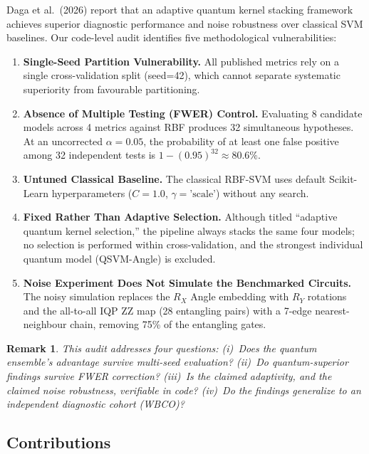\documentclass[journal,twocolumn]{IEEEtran}
\newtheorem{remark}{Remark}
\begin{document}
Daga et al.\ (2026) \cite{daga2026adaptive} report that an adaptive quantum kernel stacking framework achieves superior diagnostic performance and noise robustness over classical SVM baselines. Our code-level audit identifies five methodological vulnerabilities:

\begin{enumerate}
    \item \textbf{Single-Seed Partition Vulnerability.} All published metrics rely on a single cross-validation split (seed=42), which cannot separate systematic superiority from favourable partitioning.
    \item \textbf{Absence of Multiple Testing (FWER) Control.} Evaluating 8 candidate models across 4 metrics against RBF produces 32 simultaneous hypotheses. At an uncorrected $\alpha = 0.05$, the probability of at least one false positive among 32 independent tests is $1 - (0.95)^{32} \approx 80.6\%$.
    \item \textbf{Untuned Classical Baseline.} The classical RBF-SVM uses default Scikit-Learn hyperparameters ($C=1.0$, $\gamma=\text{'scale'}$) without any search.
    \item \textbf{Fixed Rather Than Adaptive Selection.} Although titled ``adaptive quantum kernel selection,'' the pipeline always stacks the same four models; no selection is performed within cross-validation, and the strongest individual quantum model (QSVM-Angle) is excluded.
    \item \textbf{Noise Experiment Does Not Simulate the Benchmarked Circuits.} The noisy simulation replaces the $R_X$ Angle embedding with $R_Y$ rotations and the all-to-all IQP ZZ map (28 entangling pairs) with a 7-edge nearest-neighbour chain, removing 75\% of the entangling gates.
\end{enumerate}

\begin{remark}
This audit addresses four questions: (i)~Does the quantum ensemble's advantage survive multi-seed evaluation? (ii)~Do quantum-superior findings survive FWER correction? (iii)~Is the claimed adaptivity, and the claimed noise robustness, verifiable in code? (iv)~Do the findings generalize to an independent diagnostic cohort (WBCO)?
\end{remark}

\subsection{Contributions}
\end{document}
